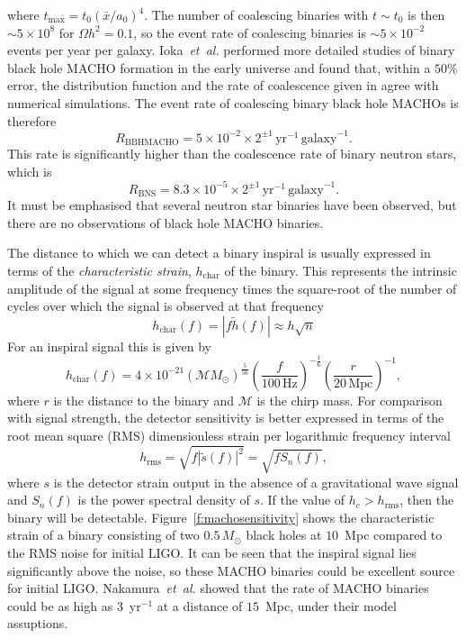 where $t_\mathrm{max} = t_0(\bar{x}/a_0)^4$. The number of coalescing binaries
with $t \sim t_0$ is then $\sim 5 \times 10^{8}$ for $\Omega h^2 = 0.1$, so
the event rate of coalescing binaries is $\sim 5 \times 10^{-2}$ events per
year per galaxy. Ioka~\emph{et~al.} performed more detailed studies of binary
black hole MACHO formation in the early universe\cite{Ioka:1998nz} and found
that, within a $50\%$ error, the distribution function and the rate of
coalescence given in \cite{Nakamura:1997sm} agree with numerical simulations.
The event rate of coalescing binary black hole MACHOs is therefore
\begin{equation}
R_\mathrm{BBHMACHO} = 5\times 10^{-2}\times 2^{\pm
1}\,\mathrm{yr}^{-1}\,\mathrm{galaxy}^{-1}.
\end{equation}
This rate is significantly higher than the coalescence rate of
binary neutron stars, which is\cite{Kalogera:2004tn}
\begin{equation}
R_\mathrm{BNS} = 8.3\times 10^{-5}\times 2^{\pm
1}\,\mathrm{yr}^{-1}\,\mathrm{galaxy}^{-1}.
\end{equation}
It must be emphasised that several neutron star binaries have been
observed, but there are no observations of black hole MACHO binaries.

The distance to which we can detect a binary inspiral is usually expressed in
terms of the \emph{characteristic strain}, $h_\mathrm{char}$ of the binary. This
represents the intrinsic amplitude of the signal at some frequency times the
square-root of the number of cycles over which the signal is observed at that
frequency
\begin{equation}
h_\mathrm{char}(f) = |f \tilde{h}(f)| \approx h \sqrt{n}
\end{equation}
 For an inspiral signal this is given by\cite{Thorne:1982cv}
\begin{equation}
h_\mathrm{char}(f)  =  4 \times 10^{-21} \left(\mathcal{M}{M_\odot}\right)^\frac{5}{56}
\left(\frac{f}{100\,\mathrm{Hz}}\right)^{-\frac{1}{6}} \left(\frac{r}{20\,
\mathrm{Mpc}}\right)^{-1},
\end{equation}
where $r$ is the distance to the binary and $\mathcal{M}$ is the chirp mass.
For comparison with signal strength, the detector sensitivity is better
expressed in terms of the root mean square (RMS) dimensionless strain per
logarithmic frequency interval
\begin{equation}
h_\mathrm{rms} = \sqrt{f |\tilde{s}(f)|^2} = \sqrt{f S_n(f)},
\end{equation}
where $s$ is the detector strain output in the absence of a gravitational wave
signal and $S_n(f)$ is the power spectral density of $s$. If the value of $h_c
> h_\mathrm{rms}$, then the binary will be
detectable. Figure~\ref{f:machosensitivity} shows the characteristic strain of
a binary consisting of two $0.5\,M_\odot$ black holes at $10$~Mpc compared to
the RMS noise for initial LIGO. It can be seen that the inspiral signal lies
significantly above the noise, so these MACHO binaries could be excellent
source for initial LIGO. Nakamura~\emph{et~al.} showed that the rate of MACHO
binaries could be as high as $3$~yr$^{-1}$ at a distance of
$15$~Mpc\cite{Nakamura:1997sm}, under their model assuptions.

